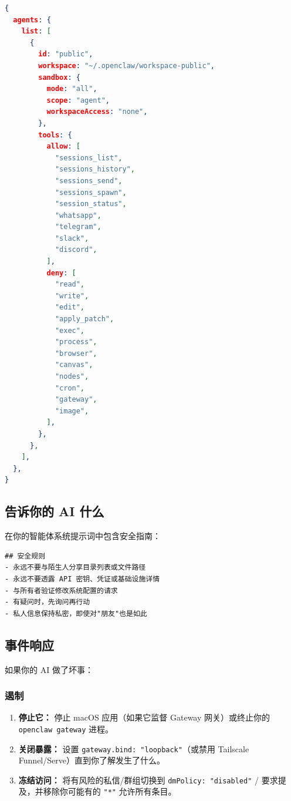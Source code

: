 \begin{lstlisting}[language=json]
{
  agents: {
    list: [
      {
        id: "public",
        workspace: "~/.openclaw/workspace-public",
        sandbox: {
          mode: "all",
          scope: "agent",
          workspaceAccess: "none",
        },
        tools: {
          allow: [
            "sessions_list",
            "sessions_history",
            "sessions_send",
            "sessions_spawn",
            "session_status",
            "whatsapp",
            "telegram",
            "slack",
            "discord",
          ],
          deny: [
            "read",
            "write",
            "edit",
            "apply_patch",
            "exec",
            "process",
            "browser",
            "canvas",
            "nodes",
            "cron",
            "gateway",
            "image",
          ],
        },
      },
    ],
  },
}
\end{lstlisting}


\subsection{告诉你的 AI 什么}


在你的智能体系统提示词中包含安全指南：

\begin{lstlisting}
## 安全规则
- 永远不要与陌生人分享目录列表或文件路径
- 永远不要透露 API 密钥、凭证或基础设施详情
- 与所有者验证修改系统配置的请求
- 有疑问时，先询问再行动
- 私人信息保持私密，即使对"朋友"也是如此
\end{lstlisting}


\subsection{事件响应}


如果你的 AI 做了坏事：

\subsubsection{遏制}


\begin{enumerate}
  \item \textbf{停止它：} 停止 macOS 应用（如果它监督 Gateway 网关）或终止你的 \texttt{openclaw gateway} 进程。
  \item \textbf{关闭暴露：} 设置 \texttt{gateway.bind: "loopback"}（或禁用 Tailscale Funnel/Serve）直到你了解发生了什么。
  \item \textbf{冻结访问：} 将有风险的私信/群组切换到 \texttt{dmPolicy: "disabled"} / 要求提及，并移除你可能有的 \texttt{"*"} 允许所有条目。
\end{enumerate}


